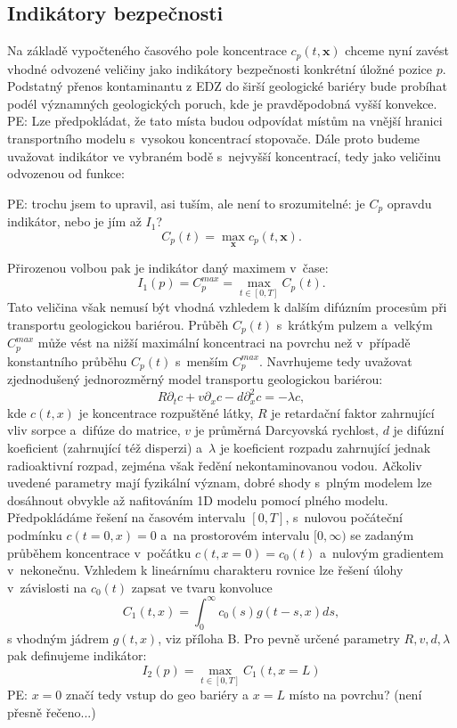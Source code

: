 \documentclass{article}
\def\vc#1{\mathbf{\boldsymbol{#1}}}     %
\newcommand{\pe}[1]{{\color{orange} PE: #1}}
\begin{document}
\subsection{Indikátory bezpečnosti}
\label{sec:indikatory}
Na základě vypočteného časového pole koncentrace $c_p(t, \vc x)$ chceme nyní zavést vhodné odvozené veličiny jako indikátory bezpečnosti 
konkrétní úložné pozice $p$. Podstatný přenos kontaminantu z EDZ do širší geologické bariéry bude probíhat podél významných geologických poruch, 
kde je pravděpodobná vyšší konvekce. 
\pe{Lze předpokládat, že tato místa budou odpovídat místům na vnější hranici transportního modelu s~vysokou koncentrací stopovače. 
Dále proto budeme uvažovat indikátor ve vybraném bodě s~nejvyšší koncentrací, tedy jako veličinu odvozenou od funkce:}

\pe{trochu jsem to upravil, asi tuším, ale není to srozumitelné: je $C_p$ opravdu indikátor, nebo je jím až $I_1$?}
\[
  C_p(t) = \max_{\vc x} c_p(t, \vc x).
\]

Přirozenou volbou pak je indikátor daný maximem v~čase:
\begin{equation}
    I_1(p) = C_p^{max} = \max_{t\in[0, T]} C_p(t).
\end{equation}
Tato veličina však nemusí být vhodná vzhledem k dalším difúzním procesům při transportu geologickou bariérou.
Průběh $C_p(t)$ s~krátkým pulzem a~velkým $C_p^{max}$ může vést na nižší maximální koncentraci na povrchu než v~případě konstantního průběhu $C_p(t)$ s~menším  $C_p^{max}$. Navrhujeme tedy uvažovat zjednodušený jednorozměrný model transportu geologickou bariérou:
\begin{equation}
    \label{eq:ad}
    R\partial_t c + v \partial_x c - d \partial^2_x c = - \lambda c,
\end{equation}
kde $c(t,x)$ je koncentrace rozpuštěné látky, $R$ je retardační faktor zahrnující vliv sorpce a~difúze do matrice, $v$ je průměrná Darcyovská rychlost, $d$ je difúzní koeficient (zahrnující též disperzi) a~$\lambda$ je koeficient rozpadu zahrnující jednak radioaktivní rozpad, zejména však ředění nekontaminovanou vodou. Ačkoliv uvedené parametry mají fyzikální význam, dobré shody s~plným modelem lze dosáhnout obvykle až nafitováním 1D modelu pomocí plného modelu.
Předpokládáme řešení na časovém intervalu  $[0, T]$, s~nulovou počáteční podmínku $c(t=0, x) = 0$ a~na prostorovém intervalu $[0, \infty)$ se zadaným 
průběhem koncentrace v~počátku $c(t, x=0) = c_0(t)$ a~nulovým gradientem v~nekonečnu.
Vzhledem k lineárnímu charakteru rovnice lze řešení úlohy v~závislosti na $c_0(t)$ zapsat ve tvaru konvoluce
\begin{equation}
    C_1(t, x) = \int_{0}^\infty c_0(s) g(t - s, x) ds,
\end{equation}
s  vhodným jádrem $g(t, x)$, viz příloha B. Pro pevně určené parametry $R, v, d, \lambda$ pak definujeme indikátor:
\begin{equation}
    I_2(p) =  \max_{t\in[0, T]} C_1(t, x=L)
\end{equation}
\pe{$x=0$ značí tedy vstup do geo bariéry a $x=L$  místo na povrchu? (není přesně řečeno...)}
\end{document}
